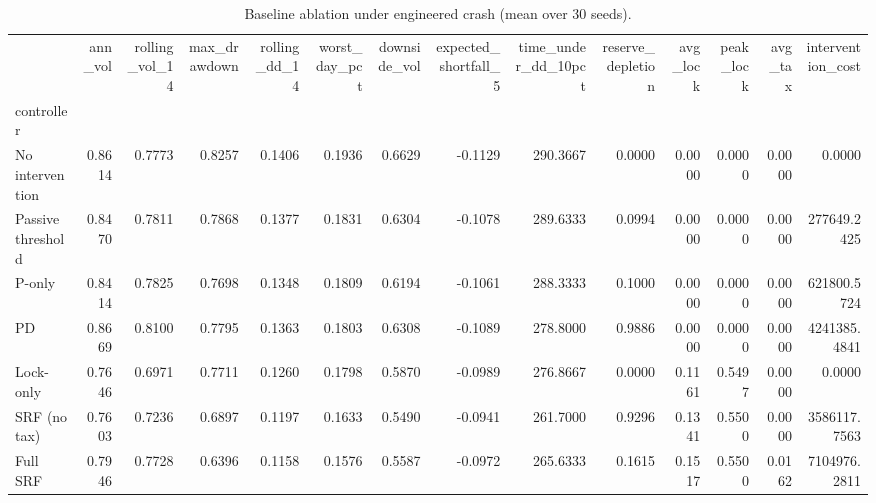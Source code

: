 \begin{table}
\caption{Baseline ablation under engineered crash (mean over 30 seeds).}
\label{tab:abl}
\begin{tabular}{lrrrrrrrrrrrrr}
\toprule
 & ann_vol & rolling_vol_14 & max_drawdown & rolling_dd_14 & worst_day_pct & downside_vol & expected_shortfall_5 & time_under_dd_10pct & reserve_depletion & avg_lock & peak_lock & avg_tax & intervention_cost \\
controller &  &  &  &  &  &  &  &  &  &  &  &  &  \\
\midrule
No intervention & 0.8614 & 0.7773 & 0.8257 & 0.1406 & 0.1936 & 0.6629 & -0.1129 & 290.3667 & 0.0000 & 0.0000 & 0.0000 & 0.0000 & 0.0000 \\
Passive threshold & 0.8470 & 0.7811 & 0.7868 & 0.1377 & 0.1831 & 0.6304 & -0.1078 & 289.6333 & 0.0994 & 0.0000 & 0.0000 & 0.0000 & 277649.2425 \\
P-only & 0.8414 & 0.7825 & 0.7698 & 0.1348 & 0.1809 & 0.6194 & -0.1061 & 288.3333 & 0.1000 & 0.0000 & 0.0000 & 0.0000 & 621800.5724 \\
PD & 0.8669 & 0.8100 & 0.7795 & 0.1363 & 0.1803 & 0.6308 & -0.1089 & 278.8000 & 0.9886 & 0.0000 & 0.0000 & 0.0000 & 4241385.4841 \\
Lock-only & 0.7646 & 0.6971 & 0.7711 & 0.1260 & 0.1798 & 0.5870 & -0.0989 & 276.8667 & 0.0000 & 0.1161 & 0.5497 & 0.0000 & 0.0000 \\
SRF (no tax) & 0.7603 & 0.7236 & 0.6897 & 0.1197 & 0.1633 & 0.5490 & -0.0941 & 261.7000 & 0.9296 & 0.1341 & 0.5500 & 0.0000 & 3586117.7563 \\
Full SRF & 0.7946 & 0.7728 & 0.6396 & 0.1158 & 0.1576 & 0.5587 & -0.0972 & 265.6333 & 0.1615 & 0.1517 & 0.5500 & 0.0162 & 7104976.2811 \\
\bottomrule
\end{tabular}
\end{table}
